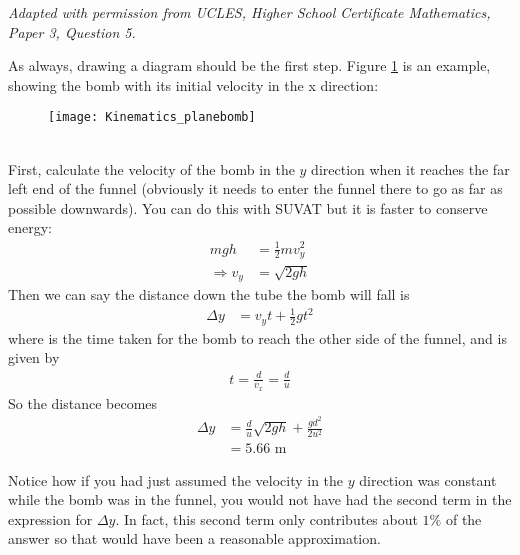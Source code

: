 

\begin{problem} %
{ }
{\textit{Adapted with permission from UCLES, Higher School Certificate Mathematics, Paper 3, Question 5.}}
{
As always, drawing a diagram should be the first step. Figure \ref{fig:Kinematics_planebomb} is an example, showing the bomb with its initial velocity  in the x direction:
\begin{figure}[h]
\centering
\texttt{[image: Kinematics\_planebomb]}
\caption{}
\label{fig:Kinematics_planebomb}
\end{figure}
\\
First, calculate the velocity of the bomb in the $y$ direction when it reaches the far left end of the funnel (obviously it needs to enter the funnel there to go as far as possible downwards). You can do this with SUVAT but it is faster to conserve energy:
\begin{align*}
mgh&=\frac{1}{2}mv_y^2 \\
\Rightarrow v_y&=\sqrt{2gh}
\end{align*}
Then we can say the distance down the tube  the bomb will fall is 
\begin{align*}
\Delta y&=v_yt+\frac{1}{2}gt^2
\end{align*}
where  is the time taken for the bomb to reach the other side of the funnel, and is given by 
\begin{align*}
t=\frac{d}{v_x}=\frac{d}{u}
\end{align*}
So the distance becomes
\begin{align*}
\Delta y&=\frac{d}{u}\sqrt{2gh}+\frac{gd^2}{2u^2} \\
&=5.66\textrm{ m}
\end{align*}

Notice how if you had just assumed the velocity in the $y$ direction was constant while the bomb was in the funnel, you would not have had the second term in the expression for $\Delta y$. In fact, this second term only contributes about $1\%$ of the answer so that would have been a reasonable approximation. 
}
\end{problem}